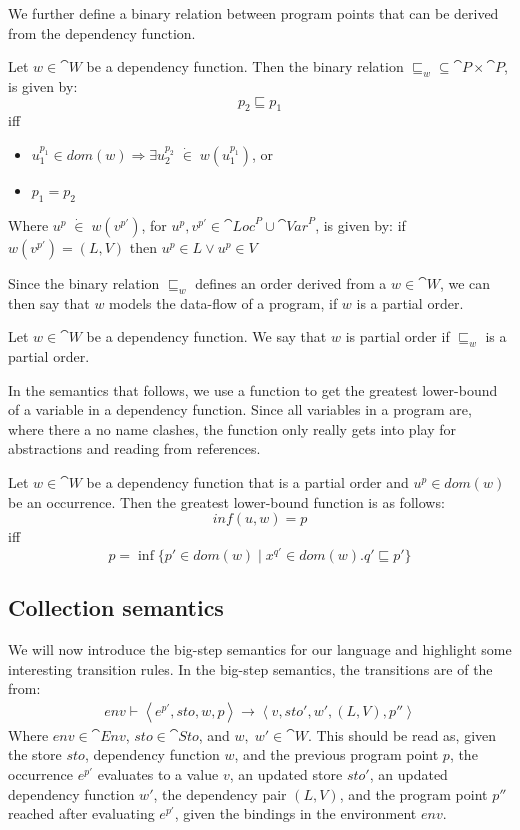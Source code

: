 \documentclass[../../master.tex]{subfiles}
\begin{document}
We further define a binary relation between program points that can be derived from the dependency function.

\begin{definition}[Relation on $w$]\label{def:popular}
	Let $w\in\cat{W}$ be a dependency function.
	Then the binary relation $\sqsubseteq_w\subseteq\cat{P}\times\cat{P}$, is given by:
	$$p_2\sqsubseteq p_1$$
	iff
	\begin{itemize}
		\item $u_1^{p_1}\in dom(w)\Rightarrow\exists u_2^{p_2}\;\dot{\in}\; w(u_1^{p_1})$, or
		\item $p_1=p_2$
	\end{itemize}
	Where $u^{p}\;\dot{\in}\;w(v^{p'})$, for $u^p,v^{p'}\in\cat{Loc}^P\cup\cat{Var}^P$, is given by:
	if $w(v^{p'})=(L,V)$ then $u^{p}\in L\vee u^{p}\in V$
\end{definition}

Since the binary relation $\sqsubseteq_w$ defines an order derived from a $w\in\cat{W}$, we can then say that $w$ models the data-flow of a program, if $w$ is a partial order.

\begin{definition}
	Let $w\in\cat{W}$ be a dependency function.
	We say that $w$ is partial order if $\sqsubseteq_w$ is a partial order.
\end{definition}


In the semantics that follows, we use a function to get the greatest lower-bound of a variable in a dependency function.
Since all variables in a program are, where there a no name clashes, the function only really gets into play for abstractions and reading from references.

\begin{definition}
	Let $w\in\cat{W}$ be a dependency function that is a partial order and $u^p\in dom(w)$ be an occurrence.
	Then the greatest lower-bound function is as follows:
	$$inf(u,w)=p$$
	iff
	$$p=\inf\{p'\in dom(w)\mid x^{q'}\in dom(w). q'\sqsubseteq p'\}$$
\end{definition}

\subsection{Collection semantics}\label{sec:sem}
We will now introduce the big-step semantics for our language and highlight some interesting transition rules.
In the big-step semantics, the transitions are of the from:
\begin{align*}
env\vdash\left\langle e^{p'},sto,w,p\right\rangle\rightarrow\left\langle v,sto',w',(L,V),p''\right\rangle
\end{align*}
Where $env\in\cat{Env}$, $sto\in\cat{Sto}$, and $w,\;w'\in\cat{W}$.
This should be read as, given the store $sto$, dependency function $w$, and the previous program point $p$, the occurrence $e^{p'}$ evaluates to a value $v$, an updated store $sto'$, an updated dependency function $w'$, the dependency pair $(L,V)$, and the program point $p''$ reached after evaluating $e^{p'}$, given the bindings in the environment $env$.
\end{document}
